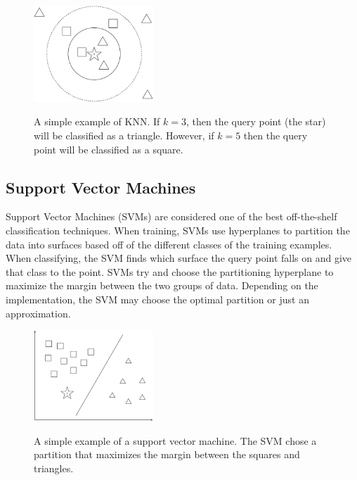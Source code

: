 \documentclass[12pt]{ucthesis}
\newcommand{\captionfonts}{\small\bf\ssp}
\begin{document}
\begin{figure}
   \begin{center}
      \includegraphics[width=0.4\textwidth]{images/KNN.eps}
      \captionfonts
      \caption[K-Nearest Neighbors]{A simple example of KNN. If $k = 3$, then the query point (the star) will be classified as a triangle. However, if $k = 5$ then the query point will be classified as a square.}
      \label{fig:knn}
   \end{center}
\end{figure}

\subsection{Support Vector Machines}
\label{background-classifiers-svm}
Support Vector Machines (SVMs) are considered one of the best off-the-shelf classification techniques\cite{Vapnik}.
When training, SVMs use hyperplanes to partition the data into surfaces based off of the different classes of the training examples.
When classifying, the SVM finds which surface the query point falls on and give that class to the point.
SVMs try and choose the partitioning hyperplane to maximize the margin between the two groups of data.
Depending on the implementation, the SVM may choose the optimal partition or just an approximation.

\begin{figure}
   \begin{center}
      \includegraphics[width=0.4\textwidth]{images/SVM.eps}
      \captionfonts
      \caption[Support Vector Machine]{A simple example of a support vector machine. The SVM chose a partition that maximizes the margin between the squares and triangles.}
      \label{fig:svm}
   \end{center}
\end{figure}
\end{document}
